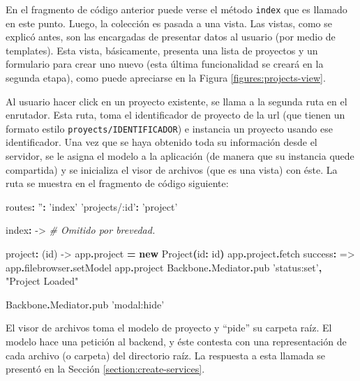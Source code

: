 \documentclass[12pt,spanish,letter]{report}
\newenvironment{Shaded}{}{}
\newcommand{\KeywordTok}[1]{\textcolor[rgb]{0.00,0.44,0.13}{\textbf{{#1}}}}
\newcommand{\DataTypeTok}[1]{\textcolor[rgb]{0.56,0.13,0.00}{{#1}}}
\newcommand{\StringTok}[1]{\textcolor[rgb]{0.25,0.44,0.63}{{#1}}}
\newcommand{\CommentTok}[1]{\textcolor[rgb]{0.38,0.63,0.69}{\textit{{#1}}}}
\newcommand{\FunctionTok}[1]{\textcolor[rgb]{0.02,0.16,0.49}{{#1}}}
\newcommand{\NormalTok}[1]{{#1}}
\begin{document}
En el fragmento de código anterior puede verse el método \texttt{index}
que es llamado en este punto. Luego, la colección es pasada a una vista.
Las vistas, como se explicó antes, son las encargadas de presentar datos
al usuario (por medio de templates). Esta vista, básicamente, presenta
una lista de proyectos y un formulario para crear uno nuevo (esta última
funcionalidad se creará en la segunda etapa), como puede apreciarse en
la Figura \ref{figures:projects-view}.

Al usuario hacer click en un proyecto existente, se llama a la segunda
ruta en el enrutador. Esta ruta, toma el identificador de proyecto de la
url (que tienen un formato estilo \texttt{proyects/IDENTIFICADOR}) e
instancia un proyecto usando ese identificador. Una vez que se haya
obtenido toda su información desde el servidor, se le asigna el modelo a
la aplicación (de manera que su instancia quede compartida) y se
inicializa el visor de archivos (que es una vista) con éste. La ruta se
muestra en el fragmento de código siguiente:

\begin{Shaded}
\begin{Highlighting}[]
\NormalTok{routes}\KeywordTok{:}
  \StringTok{''}\KeywordTok{:} \StringTok{'index'}
  \StringTok{'projects/:id'}\KeywordTok{:} \StringTok{'project'}

\NormalTok{index}\KeywordTok{:} \FunctionTok{->}
  \CommentTok{# Omitido por brevedad.}

\NormalTok{project}\KeywordTok{:} \FunctionTok{(id) ->}
  \NormalTok{app}\KeywordTok{.}\NormalTok{project }\KeywordTok{=} \KeywordTok{new} \DataTypeTok{Project}\KeywordTok{(}\NormalTok{id}\KeywordTok{:} \NormalTok{id}\KeywordTok{)}
  \NormalTok{app}\KeywordTok{.}\NormalTok{project}\KeywordTok{.}\NormalTok{fetch}
    \NormalTok{success}\KeywordTok{:} \FunctionTok{=>}
      \NormalTok{app}\KeywordTok{.}\NormalTok{filebrowser}\KeywordTok{.}\NormalTok{setModel app}\KeywordTok{.}\NormalTok{project}
      \NormalTok{Backbone}\KeywordTok{.}\NormalTok{Mediator}\KeywordTok{.}\NormalTok{pub }\StringTok{'status:set'}\KeywordTok{,} \StringTok{"Project Loaded"}

  \NormalTok{Backbone}\KeywordTok{.}\NormalTok{Mediator}\KeywordTok{.}\NormalTok{pub }\StringTok{'modal:hide'}
\end{Highlighting}
\end{Shaded}

El visor de archivos toma el modelo de proyecto y ``pide'' su carpeta
raíz. El modelo hace una petición al backend, y éste contesta con una
representación de cada archivo (o carpeta) del directorio raíz. La
respuesta a esta llamada se presentó en la Sección
\ref{section:create-services}.
\end{document}
